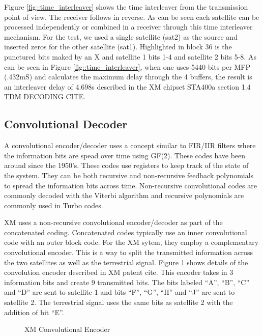 \documentclass[conference,onecolumn]{IEEEtran}
\begin{document}
Figure \ref{fig::time_interleaver} shows the time interleaver from the transmission point of view.  The receiver follows in reverse. As can be seen each satellite can be processed independently or combined in a receiver through this time interleaver mechanism.  For the test, we used a single satellite (sat2) as the source and inserted zeros for the other satellite (sat1). Highlighted in block 36 is the punctured bits maked by an X and satellite 1 bits 1-4 and satellite 2 bits 5-8.  As can be seen in Figure \ref{fig::time_interleaver}, when one uses 5440 bits per MFP (.432mS) and calculates the maximum delay through the 4 buffers, the result is an interleaver delay of 4.698s described in the XM chipset STA400a section 1.4 TDM DECODING {CITE}.

\subsection{Convolutional Decoder}

A convolutional encoder/decoder uses a concept similar to FIR/IIR filters where the information bits are spead over time using GF(2).  These codes have been around since the 1950's.  These codes use registers to keep track of the state of the system.  They can be both recursive and non-recursive feedback polynomials to spread the information bits across time.  Non-recursive convolutional codes are commonly decoded with the Viterbi algorithm and recursive polynomials are commonly used in Turbo codes.

XM uses a non-recursive convolutional encoder/decoder as part of the concatenated coding.  Concatenated codes typically use an inner convolutional code with an outer block code.  For the XM sytem, they employ a complementary convolutional encoder.  This is a way to split the transmitted information across the two satellites as well as the terrestrial signal.  Figure \ref{fig::Viterbi} shows details of the convolution encoder described in XM patent {cite}.  This encoder takes in 3 information bits and create 9 transmitted bits.  The bits labeled ``A'', ``B'', ``C'' and ``D'' are sent to satellite 1 and bits ``F'', ``G'', ``H'' and ``J'' are sent to satellite 2.  The terrestrial signal uses the same bits as satellite 2 with the addition of bit ``E''.

\begin{figure}[H]
	\centerline{}
	\caption{XM Convolutional Encoder}
	\label{fig::Viterbi}
\end{figure}
\end{document}
